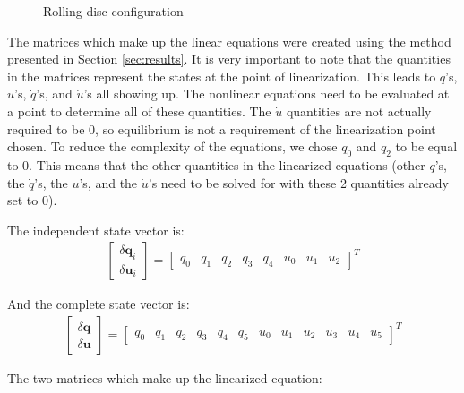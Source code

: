 \documentclass[smallcondensed]{svjour3}                     %
\begin{document}
\begin{figure}
  \centering
  
  \caption{Rolling disc configuration}
  \label{fig:disc}
\end{figure}

The matrices which make up the linear equations were created using the method
presented in Section \ref{sec:results}. It is very important to note that the
quantities in the matrices represent the states at the point of linearization.
This leads to $q$'s, $u$'s, $\dot{q}$'s, and $\dot{u}$'s all showing up. The
nonlinear equations need to be evaluated at a point to determine all of these
quantities. The $\dot{u}$ quantities are not actually required to be 0, so
equilibrium is not a requirement of the linearization point chosen. To reduce
the complexity of the equations, we chose $q_0$ and $q_2$ to be equal to 0.
This means that the other quantities in the linearized equations (other $q$'s,
the $\dot{q}$'s, the $u$'s, and the $\dot{u}$'s need to be solved for with
these 2 quantities already set to 0).

The independent state vector is:
\begin{align}
\begin{bmatrix}
\delta \bm{q}_i \\
\delta \bm{u}_i
\end{bmatrix} =
\begin{bmatrix}
q_0 &
q_1 &
q_2 &
q_3 &
q_4 &
u_0 &
u_1 &
u_2
\end{bmatrix}^T
\end{align}

And the complete state vector is:
\begin{align}
\begin{bmatrix}
\delta \bm{q} \\
\delta \bm{u}
\end{bmatrix} =
\left[
\begin{array}{cccccccccccc}
q_0 &
q_1 &
q_2 &
q_3 &
q_4 &
q_5 &
u_0 &
u_1 &
u_2 &
u_3 &
u_4 &
u_5
\end{array}
\right]^T
\end{align}

The two matrices which make up the linearized equation:
\end{document}

